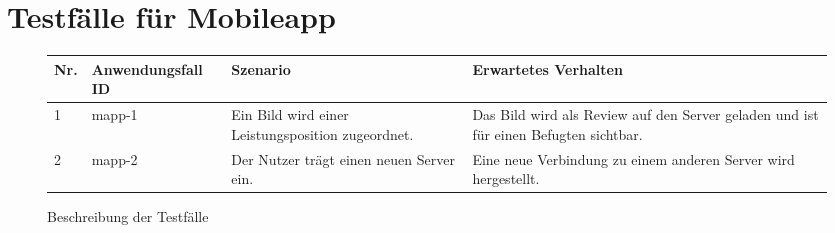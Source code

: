 \newpage
\section{Testfälle für Mobileapp}

\begin{figure}[!h]
	\begin{center}
		\begin{tabularx}{\textwidth}{ p{} | p{} | p{} | X }
			\textbf{Nr.} & \textbf{Anwendungsfall ID} & \textbf{Szenario} & \textbf{Erwartetes Verhalten} \\ \hline
			1 & mapp-1 & Ein Bild wird einer Leistungsposition zugeordnet. & Das Bild wird als Review auf den Server geladen und ist für einen Befugten sichtbar. \\ \hline
			2 & mapp-2 & Der Nutzer trägt einen neuen Server ein. & Eine neue Verbindung zu einem anderen Server wird hergestellt. \\ \hline
		\end{tabularx}	
	\end{center}
	\caption{Beschreibung der Testfälle}
	\label{fig:testfaelle-mobile-app-tabelle}
\end{figure}